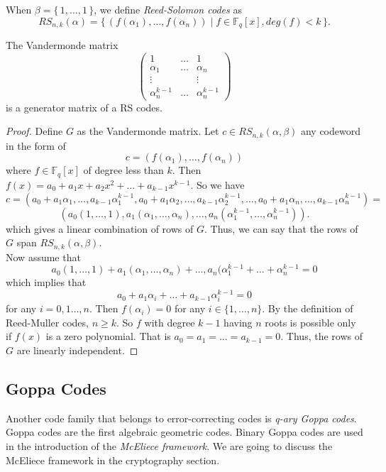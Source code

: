 When $\beta = \{\,1, \dots,1 \,\}$, we define \textit{Reed-Solomon codes} as
\[
RS_{n,k}(\alpha) = \{\, (f(\alpha_1), \dots, f(\alpha_n)) \mid f \in \mathbb{F}_q[x], deg(f) < k \,\}.
\]

\begin{proposition}
The Vandermonde matrix 
\[
\begin{pmatrix}
1 & \dots & 1 \\
\alpha_1 & \dots & \alpha_n \\
\vdots && \vdots \\
\alpha_n^{k-1} & \dots & \alpha_n^{k-1}
\end{pmatrix}
\]
is a generator matrix of a RS codes.
\end{proposition}

\begin{proof}
    Define $G$ as the Vandermonde matrix.
    Let $c\in RS_{n,k}(\alpha,\beta)$ any codeword in the form of 
    \[
    c = (f(\alpha_1),\dots,f(\alpha_n))
    \]
    where $f\in \mathbb{F}_q[x]$ of degree less than $k$. Then $f(x) = a_0+a_1x+a_2x^2+\dots+a_{k-1}x^{k-1}$. So we have
    \[
    c = (a_0+a_1\alpha_1,\dots,a_{k-1}\alpha_1^{k-1}, a_0+a_1\alpha_2,\dots,a_{k-1}\alpha_2^{k-1}, \dots,
    a_0+a_1\alpha_n,\dots,a_{k-1}\alpha_n^{k-1}) =
    \]
    \[
    (a_0(1,\dots,1),a_1(\alpha_1,\dots,\alpha_n),\dots,a_n(\alpha_1^{k-1},\dots,\alpha_n^{k-1})).
    \]
    which gives a linear combination of rows of $G$. Thus, we can say that the rows of $G$ span $RS_{n,k}(\alpha,\beta)$.\\
    Now assume that
    \[
    a_0(1,\dots,1)+a_1(\alpha_1,\dots,\alpha_n)+\dots,a_n(\alpha_1^{k-1}+\dots+\alpha_n^{k-1} = 0
    \]
    which implies that
    \[
    a_0+a_1\alpha_i+\dots+a_{k-1}\alpha_i^{k-1} = 0
    \] for any $i = 0,1\dots,n$. Then $f(\alpha_i)=0$ for any $i\in \{1,\dots,n\}$. By the definition of Reed-Muller codes, $n\geq k$. So $f$ with degree $k-1$ having $n$ roots is possible only if $f(x)$ is a zero polynomial. That is $a_0=a_1=\dots=a_{k-1}=0$. Thus, the rows of $G$ are linearly independent.
\end{proof}

\subsection{Goppa Codes}
Another code family that belongs to error-correcting codes is \textit{q-ary Goppa codes}. Goppa codes are the first algebraic geometric codes. Binary Goppa codes are used in the introduction of the \textit{McEliece framework}. We are going to discuss the McEliece framework in the cryptography section.

